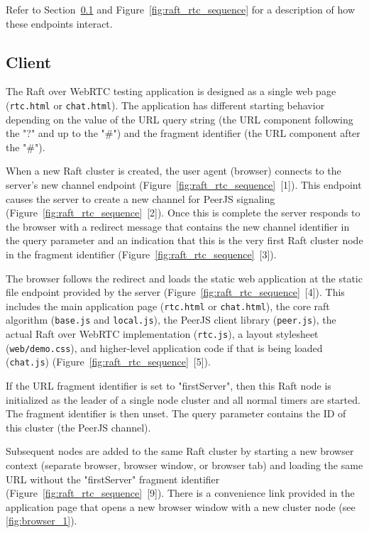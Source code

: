 \documentclass[9pt]{extarticle}
\begin{document}
\begin{multicols}{2}
\begin{enumerate}
\end{enumerate}

Refer to Section~\ref{section:design-client} and
Figure~\ref{fig:raft_rtc_sequence} for a description of how these
endpoints interact.

\subsection{Client}
    \label{section:design-client}

The Raft over WebRTC testing application is designed as a single web
page (\texttt{rtc.html} or \texttt{chat.html}). The application has
different starting behavior depending on the value of the URL query
string (the URL component following the "?" and up to the "\#") and
the fragment identifier (the URL component after the "\#").

When a new Raft cluster is created, the user agent (browser) connects
to the server's new channel endpoint
(Figure~\ref{fig:raft_rtc_sequence}~[1]). This endpoint causes the
server to create a new channel for PeerJS signaling
(Figure~\ref{fig:raft_rtc_sequence}~[2]). Once this is complete the
server responds to the browser with a redirect message
that contains the new channel identifier in the query parameter and an
indication that this is the very first Raft cluster node in the
fragment identifier (Figure~\ref{fig:raft_rtc_sequence}~[3]).

The browser follows the redirect and loads the static web application
at the static file endpoint provided by the server
(Figure~\ref{fig:raft_rtc_sequence}~[4]). This includes the
main application page (\texttt{rtc.html} or \texttt{chat.html}), the
core raft algorithm (\texttt{base.js} and \texttt{local.js}), the
PeerJS client library (\texttt{peer.js}), the actual Raft over WebRTC
implementation (\texttt{rtc.js}), a layout stylesheet
(\texttt{web/demo.css}), and higher-level application code if that is
being loaded (\texttt{chat.js})
(Figure~\ref{fig:raft_rtc_sequence}~[5]).

If the URL fragment identifier is set to "firstServer", then this Raft
node is initialized as the leader of a single node cluster and all
normal timers are started. The fragment identifier is then unset. The
query parameter contains the ID of this cluster (the PeerJS channel).

Subsequent nodes are added to the same Raft cluster by starting a new
browser context (separate browser, browser window, or browser tab) and
loading the same URL without the "firstServer" fragment identifier
(Figure~\ref{fig:raft_rtc_sequence}~[9]). There is a convenience link
provided in the application page that opens a new browser window with
a new cluster node (see \ref{fig:browser_1}).


\end{multicols}
\end{document}
